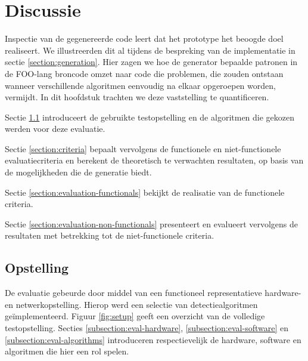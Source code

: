 
\chapter{Discussie}
\label{chapter:discussie}

Inspectie van de gegenereerde code leert dat het prototype het beoogde doel
realiseert. We illustreerden dit al tijdens de bespreking van de implementatie
in sectie \ref{section:generation}. Hier zagen we hoe de generator bepaalde
patronen in de FOO-lang broncode omzet naar code die problemen, die zouden
ontstaan wanneer verschillende algoritmen eenvoudig na elkaar opgeroepen
worden, vermijdt. In dit hoofdstuk trachten we deze vaststelling te
quantificeren.

Sectie \ref{section:setup} introduceert de gebruikte testopstelling en de
algoritmen die gekozen werden voor deze evaluatie.

Sectie \ref{section:criteria} bepaalt vervolgens de functionele en
niet-functionele evaluatiecriteria en berekent de theoretisch te verwachten
resultaten, op basis van de mogelijkheden die de generatie biedt.

Sectie \ref{section:evaluation-functionals} bekijkt de realisatie van de
functionele criteria.

Sectie \ref{section:evaluation-non-functionals} presenteert en evalueert
vervolgens de resultaten met betrekking tot de niet-functionele criteria.

\vspace{-3mm}

\section{Opstelling}
\label{section:setup}

De evaluatie gebeurde door middel van een functioneel representatieve hardware-
en netwerkopstelling. Hierop werd een selectie van detectiealgoritmen
ge\"implementeerd. Figuur \ref{fig:setup} geeft een overzicht van de volledige
testopstelling. Secties \ref{subsection:eval-hardware},
\ref{subsection:eval-software} en \ref{subsection:eval-algorithms} introduceren
respectievelijk de hardware, software en algoritmen die hier een rol spelen.

